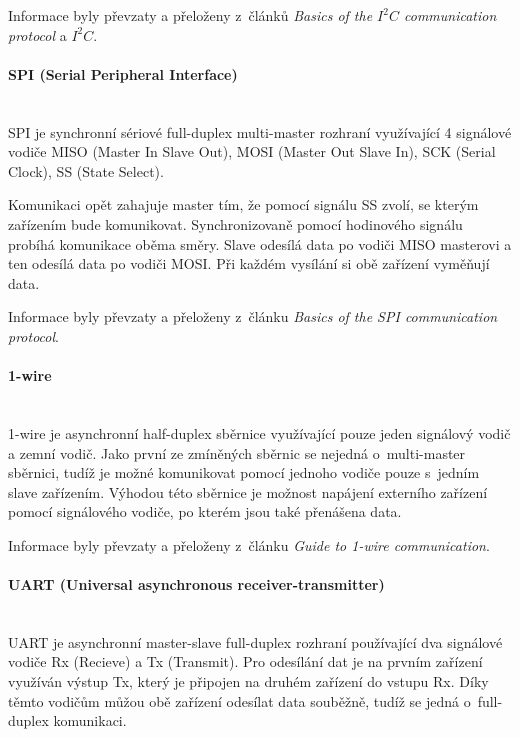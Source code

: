 Informace byly převzaty a přeloženy z~článků \emph{Basics of the $I^2C$ communication protocol}\cite{i2c-protocol-basics} a \emph{$I^2C$}\cite{i2c-protocol-all}.

\paragraph*{SPI (Serial Peripheral Interface)}\mbox{} \\
SPI je synchronní sériové full-duplex multi-master rozhraní využívající 4 signálové vodiče MISO (Master In Slave Out), MOSI (Master Out Slave In), SCK (Serial Clock), SS (State Select).

Komunikaci opět zahajuje master tím, že pomocí signálu SS zvolí, se kterým zařízením bude komunikovat. Synchronizovaně pomocí hodinového signálu probíhá komunikace oběma směry. Slave odesílá data po vodiči MISO masterovi a ten odesílá data po vodiči MOSI. Při každém vysílání si obě zařízení vyměňují data.

Informace byly převzaty a přeloženy z~článku \emph{Basics of the SPI communication protocol}\cite{spi-protocol-basics}.

\paragraph*{1-wire}\mbox{} \\
1-wire je asynchronní half-duplex sběrnice využívající pouze jeden signálový vodič a zemní vodič. Jako první ze zmíněných sběrnic se nejedná o~multi-master sběrnici, tudíž je možné komunikovat pomocí jednoho vodiče pouze s~jedním slave zařízením. Výhodou této sběrnice je možnost napájení externího zařízení pomocí signálového vodiče, po kterém jsou také přenášena data. 

Informace byly převzaty a přeloženy z~článku \emph{Guide to 1-wire communication}\cite{1wire-protocol-basics}.

\paragraph*{UART (Universal asynchronous receiver-transmitter)}\mbox{} \\
UART je asynchronní master-slave full-duplex rozhraní používající dva signálové vodiče Rx (Recieve) a Tx (Transmit). Pro odesílání dat je na prvním zařízení využíván výstup Tx, který je připojen na druhém zařízení do vstupu Rx. Díky těmto vodičům můžou obě zařízení odesílat data souběžně, tudíž se jedná o~full-duplex komunikaci.

